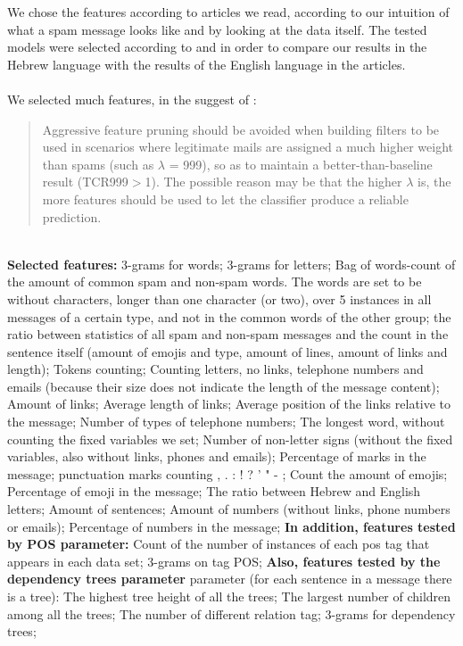 \documentclass[11pt,a4paper]{article}
\begin{document}
We chose the features according to articles we read, according to our intuition of what a spam message looks like and by looking at the data itself. The tested models were selected according to \citep{andrew2007scalable} and \citep{Ando2005} in order to compare our results in the Hebrew language with the results of the English language in the articles.\\\\
We selected much features, in the suggest of \citep{andrew2007scalable}:
\begin{quote}
Aggressive feature pruning should be avoided when building filters to be used in scenarios where legitimate mails are assigned a much higher weight than spams (such as $\lambda$ = 999), so as to maintain a better-than-baseline result (TCR999${>}$1). The possible reason may be that the higher $\lambda$ is, the more features should be used to let the classifier produce a reliable prediction.
\end{quote}\\
\textbf{Selected features:} 3-grams for words; 3-grams for letters; Bag of words-count of the amount of common spam and non-spam words. The words are set to be without characters, longer than one character (or two), over 5 instances in all messages of a certain type, and not in the common words of the other group; the ratio between statistics of all spam and non-spam messages and the count in the sentence itself (amount of emojis and type, amount of lines, amount of links and length); Tokens counting; Counting letters, no links, telephone numbers and emails (because their size does not indicate the length of the message content); Amount of links; Average length of links; Average position of the links relative to the message; Number of types of telephone numbers; The longest word, without counting the fixed variables we set; Number of non-letter signs (without the fixed variables, also without links, phones and emails); Percentage of marks in the message; punctuation marks counting , . : ! ? ' " - ; Count the amount of emojis; Percentage of emoji in the message; The ratio between Hebrew and English letters; Amount of sentences; Amount of numbers (without links, phone numbers or emails); Percentage of numbers in the message; \textbf{In addition, features tested by POS parameter:} Count of the number of instances of each pos tag that appears in each data set; 3-grams on tag POS; \textbf{Also, features tested by the dependency trees parameter} parameter (for each sentence in a message there is a tree): The highest tree height of all the trees; The largest number of children among all the trees; The number of different relation tag; 3-grams for dependency trees; 
\end{document}
